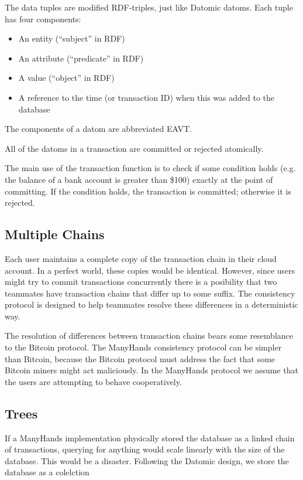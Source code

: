 \documentclass[pldi,10pt,preprint]{sigplanconf-pldi16}
\begin{document}
The data tuples are modified RDF-triples, just like Datomic datoms.
Each tuple has four components:

\begin{itemize}
\item An entity (``subject'' in RDF)
\item An attribute (``predicate'' in RDF)
\item A value (``object'' in RDF)
\item A reference to the time (or transaction ID) when this was added to the database
\end{itemize}

The components of a datom are abbreviated EAVT.

All of the datoms in a transaction are committed or rejected atomically.


The main use of the transaction function is to check if some condition holds (e.g. the balance of a bank account is greater than \$100) exactly at the point of committing.
If the condition holds, the transaction is committed; otherwise it is rejected.


\subsection{Multiple Chains}

Each user maintains a complete copy of the transaction chain in their cloud account.
In a perfect world, these copies would be identical.
However, since users might try to commit transactions concurrently there is a posibility that two teammates have transaction chains that differ up to some suffix.
The consistency protocol is designed to help teammates resolve these differences in a deterministic way.

The resolution of differences between transaction chains bears some resemblance to the Bitcoin protocol.
The ManyHands consistency protocol can be simpler than Bitcoin, because the Bitcoin protocol must address the fact that some Bitcoin miners might act maliciously.
In the ManyHands protocol we assume that the users are attempting to behave cooperatively.

\subsection{Trees}

If a ManyHands implementation physically stored the database as a linked chain of transactions, querying for anything would scale linearly with the size of the database.
This would be a disaster.
Following the Datomic design, we store the database as a colelction
\end{document}
